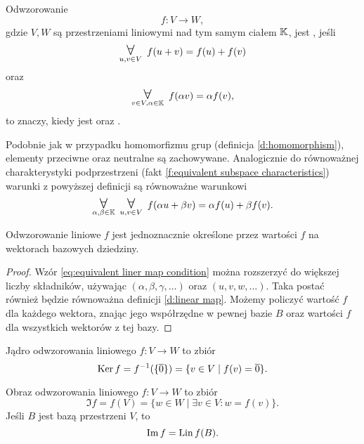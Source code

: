 \begin{definition}
    \label{d:linear map}
    Odwzorowanie
    \[ f : V \to W, \]
    gdzie $V, W$ są przestrzeniami liniowymi nad tym samym ciałem $\mathbb K$, jest , jeśli
    \[ \dforall{u, v \in V} f(u + v) = f(u) + f(v) \]
    oraz
    \[ \dforall{v \in V, \alpha \in \KK} f(\alpha v) = \alpha f(v), \]
    to znaczy, kiedy jest  oraz .
\end{definition}

Podobnie jak w przypadku homomorfizmu grup (definicja \ref{d:homomorphism}), elementy przeciwne oraz neutralne są zachowywane. Analogicznie do równoważnej charakterystyki podprzestrzeni (fakt \ref{f:equivalent subspace characteristics}) warunki z powyższej definicji są równoważne warunkowi
\begin{equation}
    \label{eq:equivalent liner map condition}
    \dforall{\alpha, \beta \in \KK}\dforall{u, v \in V} f(\alpha u + \beta v) = \alpha f(u) + \beta f(v).
\end{equation}

\begin{corollary}
    \label{c:linear map is unique by the values f(B)}
    Odwzorowanie liniowe $f$ jest jednoznacznie określone przez wartości $f$ na wektorach bazowych dziedziny.
\end{corollary}
\begin{proof}
    Wzór \ref{eq:equivalent liner map condition} można rozszerzyć do większej liczby składników, używając $(\alpha, \beta, \gamma, \ldots)$ oraz $(u, v, w, \ldots)$. Taka postać również będzie równoważna definicji \ref{d:linear map}. Możemy policzyć wartość $f$ dla każdego wektora, znając jego współrzędne w pewnej bazie $B$ oraz wartości $f$ dla wszystkich wektorów z tej bazy.
\end{proof}

\begin{definition}
    Jądro odwzorowania liniowego $f : V \to W$ to zbiór
    \[ \operatorname{Ker} f = f^{-1}(\{\overline{0}\}) = \{v \in V \mid f(v) = \overline{0}\}. \]
\end{definition}

\begin{definition}
    Obraz odwzorowania liniowego $f : V \to W$ to zbiór
    \[ \Im f = f(V) = \{w \in W \mid \exists v \in V : w = f(v)\}. \]
    Jeśli $B$ jest bazą przestrzeni $V$, to
    \[ \operatorname{Im} f = \operatorname{Lin} f(B). \]
\end{definition}

